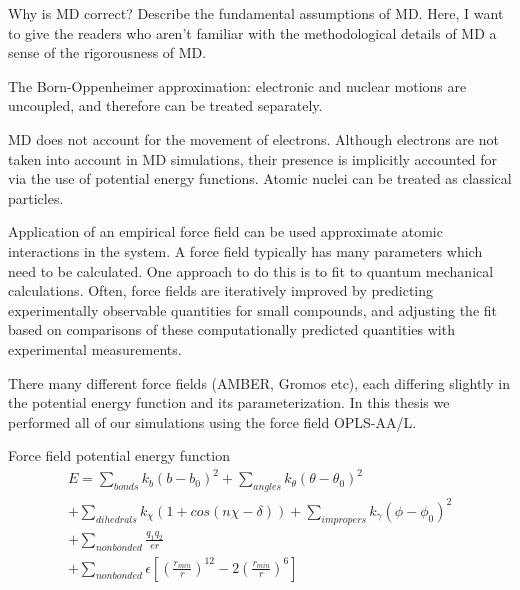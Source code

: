 \begin{outline}
	\1 Why is MD correct? Describe the fundamental assumptions of MD. Here, I want to give the readers who aren't familiar with the methodological details of MD a sense of the rigorousness of MD.
	
	\1 The Born-Oppenheimer approximation: electronic and nuclear motions are uncoupled, and therefore can be treated separately. 

	\1 MD does not account for the movement of electrons. Although electrons are not taken into account in MD simulations, their presence is implicitly accounted for via the use of potential energy functions.  Atomic nuclei can be treated as classical particles.



  \1 Application of an empirical force field can be used approximate atomic interactions in the system. A force field typically has many parameters which need to be calculated. One approach to do this is to fit to quantum mechanical calculations.  Often, force fields are iteratively improved by predicting experimentally observable quantities for small compounds, and adjusting the fit based on comparisons of these computationally predicted quantities with experimental measurements.
  
  \1 There many different force fields (AMBER, Gromos etc), each differing slightly in the potential energy function and its parameterization. In this thesis we performed all of our simulations using the force field OPLS-AA/L.

  \1 Force field potential energy function
  \begin{equation}
    \begin{split}
          E = \sum_{bonds} k_b(b-b_0)^2 
          + \sum_{angles} k_{\theta}(\theta - \theta_{0})^2 \\
          + \sum_{dihedrals} k_{\chi}(1 + cos(n\chi - \delta)) 
          + \sum_{impropers} k_{\gamma}(\phi - \phi_{0})^2 \\
          + \sum_{nonbonded} \frac{q_1q_2}{er} \\
          + \sum_{nonbonded} \epsilon [(\frac{r_{min}}{r})^{12} - 2(\frac{r_{min}}{r})^6]
    \end{split}
  \end{equation}
\end{outline}

